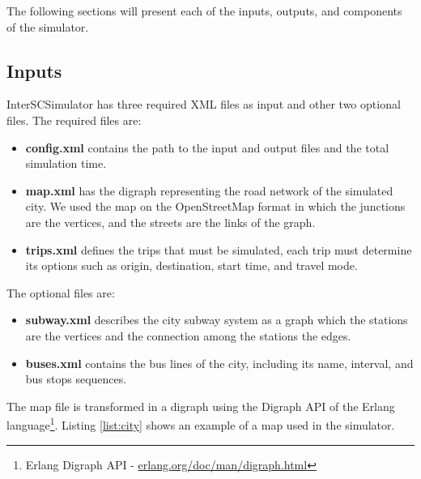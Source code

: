 The following sections will present each of the inputs, outputs, and components of the simulator.

\subsection{Inputs}

InterSCSimulator has three required XML files as input and other two optional files. The required files are:

\begin{itemize}

\item \textbf{config.xml} contains the path to the input and output files and the total simulation time.

\item \textbf{map.xml} has the digraph representing the road network of the simulated city. We used the map on the OpenStreetMap format in which the junctions are the vertices, and the streets are the links of the graph.

\item \textbf{trips.xml} defines the trips that must be simulated, each trip must determine its options such as origin, destination, start time, and travel mode.

\end{itemize}

The optional files are:

\begin{itemize}
    
\item \textbf{subway.xml} describes the city subway system as a graph which the stations are the vertices and the connection among the stations the edges.

\item \textbf{buses.xml} contains the bus lines of the city, including its name, interval, and bus stops sequences.

\end{itemize}

The map file is transformed in a digraph using the Digraph API of the Erlang language\footnote{Erlang Digraph API - \url{erlang.org/doc/man/digraph.html}}. Listing \ref{list:city} shows an example of a map used in the simulator.

